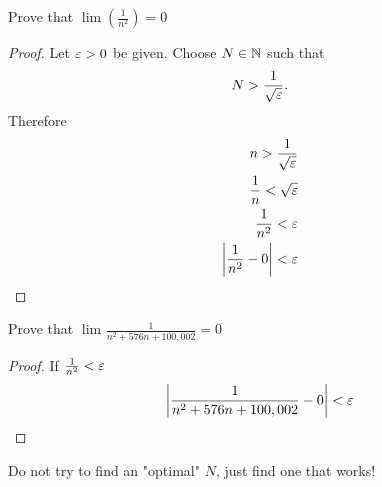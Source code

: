 \begin{eg}
	Prove that $\lim \left( \frac{1}{n^{2}} \right) = 0$
\end{eg}

\begin{proof}
	Let $\e > 0$ be given. Choose $N \in \mathbb{N}$ such that 
	\[
	N > \frac{1}{\sqrt{\e} }
	.\]
	Therefore
	\begin{align}
		n > \frac{1}{\sqrt{\e} } \\
		\frac{1}{n} < \sqrt{\e} \\
		\frac{1}{n^{2}} < \e \\
		\left|\frac{1}{n^{2}} - 0\right| < \e
	\end{align}
\end{proof}


\begin{eg}
	Prove that $\lim_{} \frac{1}{n^{2} + 576n + 100,002} = 0$
\end{eg}

\begin{proof}
	If $\frac{1}{n^{2}} < \e$ 
	\begin{equation}
		\left|\frac{1}{n^{2} + 576n + 100,002} - 0\right| < \e
	\end{equation}
\end{proof}

\begin{note}
	Do not try to find an "optimal" $N$, just find one that works!
\end{note}

